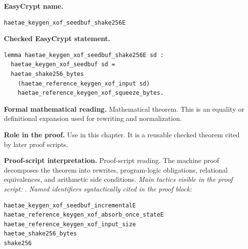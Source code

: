\begin{formaltheorem}
\noindent\textbf{EasyCrypt name.}
\begin{lstlisting}[language=EasyCrypt,basicstyle=\ttfamily\scriptsize]
haetae_keygen_xof_seedbuf_shake256E
\end{lstlisting}
\noindent\textbf{Checked EasyCrypt statement.}
\begin{lstlisting}[language=EasyCrypt,basicstyle=\ttfamily\scriptsize]
lemma haetae_keygen_xof_seedbuf_shake256E sd :
  haetae_keygen_xof_seedbuf sd =
  haetae_shake256_bytes
    (haetae_reference_keygen_xof_input sd)
    haetae_reference_keygen_xof_squeeze_bytes.
\end{lstlisting}
\noindent\textbf{Formal mathematical reading.}
Mathematical theorem. This is an equality or definitional expansion used for rewriting and normalization.

\noindent\textbf{Role in the proof.}
Use in this chapter. It is a reusable checked theorem cited by later proof scripts.

\noindent\textbf{Proof-script interpretation.}
Proof-script reading. The machine proof decomposes the theorem into rewrites, program-logic obligations, relational equivalences, and arithmetic side conditions.
\emph{Main tactics visible in the proof script:} .
\emph{Named identifiers syntactically cited in the proof block:}
\begin{lstlisting}[language=EasyCrypt,basicstyle=\ttfamily\scriptsize]
haetae_keygen_xof_seedbuf_incrementalE
haetae_reference_keygen_xof_absorb_once_stateE
haetae_reference_keygen_xof_input_size
haetae_shake256_bytes
shake256
\end{lstlisting}

\end{formaltheorem}

